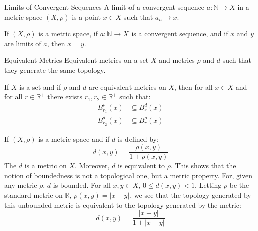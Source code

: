 \documentclass[crop=false,class=article,oneside]{standalone}
\begin{document}
            \begin{ldefinition}{Limits of Convergent Sequences}
                A limit of a convergent sequence
                $a:\mathbb{N}\rightarrow{X}$ in a metric space
                $(X,\rho)$ is a point $x\in{X}$ such that
                $a_{n}\rightarrow{x}$.
            \end{ldefinition}
            \begin{theorem}
                If $(X,\rho)$ is a metric space, if
                $a:\mathbb{N}\rightarrow{X}$ is a convergent
                sequence, and if $x$ and $y$ are limits of $a$,
                then $x=y$.
            \end{theorem}
            \begin{ldefinition}{Equivalent Metrics}
                Equivalent metrics on a set $X$ and metrics
                $\rho$ and $d$ such that they generate the
                same topology.
            \end{ldefinition}
            \begin{theorem}
                If $X$ is a set and if $\rho$ and $d$ are
                equivalent metrics on $X$, then for all $x\in{X}$
                and for all $r\in\mathbb{R}^{+}$ there exists
                $r_{1},r_{2}\in\mathbb{R}^{+}$ such that:
                \begin{align}
                    B_{r_{1}}^{\rho}(x)&\subseteq{B}_{r}^{d}(x)\\
                    B_{r_{2}}^{d}(x)&\subseteq{B}_{r}^{\rho}(x)
                \end{align}
            \end{theorem}
            \begin{lexample}
                If $(X,\rho)$ is a metric space and if $d$
                is defined by:
                \begin{equation}
                    d(x,y)=\frac{\rho(x,y)}{1+\rho(x,y)}
                \end{equation}
                The $d$ is a metric on $X$. Moreover, $d$
                is equivalent to $\rho$. This shows that the
                notion of boundedness is not a topological one,
                but a metric property. For, given any metric
                $\rho$, $d$ is bounded. For all $x,y\in{X}$,
                $0\leq{d}(x,y)<1$. Letting $\rho$ be the
                standard metric on $\mathbb{R}$,
                $\rho(x,y)=|x-y|$, we see that the topology
                generated by this unbounded metric is equivalent
                to the topology generated by the metric:
                \begin{equation}
                    d(x,y)=\frac{|x-y|}{1+|x-y|}
                \end{equation}
            \end{lexample}
\end{document}
